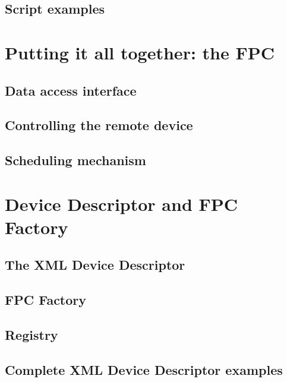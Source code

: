 \subsection{Script examples}


\section{Putting it all together: the FPC}

\subsection{Data access interface}

\subsection{Controlling the remote device}

\subsection{Scheduling mechanism}


\section{Device Descriptor and FPC Factory}

\subsection{The XML Device Descriptor}

\subsection{FPC Factory}

\subsection{Registry}

\subsection{Complete XML Device Descriptor examples}